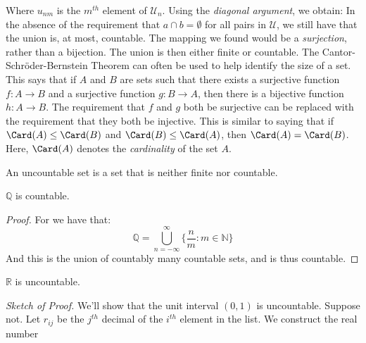\documentclass[crop=false,class=book,oneside]{standalone}
\begin{document}
            Where $u_{nm}$ is the $m^{th}$ element of
            $\mathcal{U}_{n}$.
            Using the \textit{diagonal argument},
            we obtain:
            In the absence of the requirement that
            $a\cap{b}=\emptyset$ for all pairs in $\mathcal{U}$,
            we still have that the union is, at most, countable.
            The mapping we found would be a
            \textit{surjection}, rather than a bijection.
            The union is then either finite or countable. The
            Cantor-Schr\"{o}der-Bernstein Theorem can often be
            used to help identify the size of a set. This says
            that if $A$ and $B$ are sets such that there exists
            a surjective function $f:A\rightarrow{B}$ and a
            surjective function $g:B\rightarrow{A}$, then there
            is a bijective function $h:A\rightarrow{B}$. The
            requirement that $f$ and $g$ both be surjective
            can be replaced with the requirement that they both
            be injective. This is similar to saying that if
            $\Card(A)\leq\Card(B)$ and $\Card(B)\leq\Card(A)$,
            then $\Card(A)=\Card(B)$. Here, $\Card(A)$ denotes
            the \textit{cardinality} of the set $A$.
            \begin{definition}
                An uncountable set is a set that is
                neither finite nor countable.
            \end{definition}
            \begin{theorem}
                $\mathbb{Q}$ is countable.
            \end{theorem}
            \begin{proof}
                For we have that:
                \begin{equation}
                    \mathbb{Q}=
                    \bigcup_{n=-\infty}^{\infty}
                    \Big\{\frac{n}{m}:m\in\mathbb{N}\Big\}
                \end{equation}
                And this is the union of countably
                many countable sets, and is thus countable.
            \end{proof}
            \begin{theorem}
                $\mathbb{R}$ is uncountable.
            \end{theorem}
            \textit{Sketch of Proof.} We'll show that the unit
            interval $(0,1)$ is uncountable. Suppose not.
            Let $r_{ij}$ be the $j^{th}$ decimal of the $i^{th}$
            element in the list. We construct the real number
\end{document}
